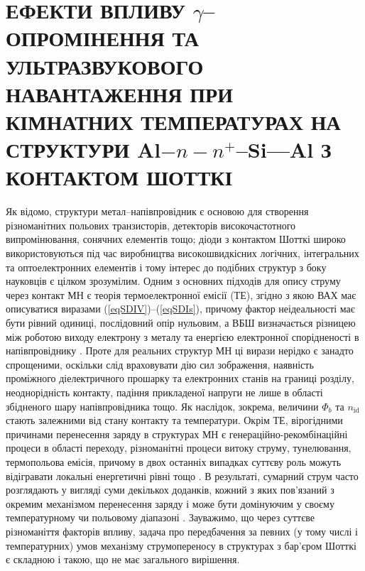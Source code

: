 \chapter{\MakeUppercase{Ефекти впливу} $\gamma$--\MakeUppercase{опромінення та ультразвукового навантаження при кімнатних температурах
на структури} Al$-n-n^+$--Si---Al \MakeUppercase{з контактом Шотткі}\label{Ch_GammaSD}}

Як відомо, структури метал--напівпровідник є основою для створення різноманітних польових транзисторів, детекторів високочастотного
випромінювання, сонячних елементів тощо;
діоди з контактом Шотткі широко використовуються під час виробництва високошвидкісних логічних, інтегральних та оптоелектронних елементів
і тому інтерес до подібних структур з боку науковців є цілком зрозумілим.
Одним з основних підходів для опису струму через контакт МН є теорія термоелектронної емісії (ТЕ),
згідно з якою \cite{Colinge,Sze2012,Rhoderick1988,StrihaBook} ВАХ має описуватися виразами (\ref{eqSDIV})--(\ref{eqSDIs}),
причому фактор неідеальності має бути рівний одиниці, послідовний опір нульовим,
а ВБШ визначається різницею між роботою виходу електрону з металу та енергією електронної спорідненості в напівпровіднику \cite{Colinge}.
Проте для реальних структур МН ці вирази нерідко є занадто спрощеними, оскільки
слід враховувати дію сил зображення, наявність проміжного діелектричного прошарку та електронних станів на границі розділу,
неоднорідність контакту, падіння прикладеної напруги не лише в області збідненого шару напівпровідника тощо.
Як наслідок, зокрема, величини $\Phi_b$ та $n_\mathrm{id}$ стають залежними від стану контакту та температури.
Окрім ТЕ, вірогідними причинами перенесення заряду в структурах МН є генераційно-рекомбінаційні процеси в області переходу,
різноманітні процеси витоку струму, тунелювання, термопольова емісія,
причому в двох останніх випадках суттєву роль можуть відігравати локальні енергетичні рівні тощо \cite{Rhoderick1988,Arslan,Donoval2010,Huang,Evstropov,VRH:Lee,Sathaiya}.
В результаті, сумарний струм часто розглядають у вигляді суми декількох доданків,
кожний з яких пов'язаний з окремим механізмом перенесення заряду і може бути домінуючим у своєму температурному чи польовому діапазоні \cite{Arslan,Donoval2010,Huang,GELCZUK2014}.
Зауважимо, що через суттєве різноманіття факторів впливу, задача про передбачення за певних
(у тому числі і температурних) умов механізму струмопереносу в структурах з бар'єром Шотткі є складною і такою, що не має загального вирішення.


